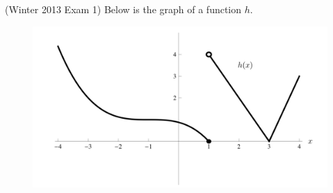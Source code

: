 \documentclass[11pt]{exam}
\begin{document}
\begin{questions}
\begin{solution}
        \end{solution}
  \question (Winter 2013 Exam 1) Below is the graph of a function $h$.
\begin{figure}[h]
\includegraphics[scale=0.5]{Figures/graphh}
\end{figure}


\end{questions}
\end{document}
